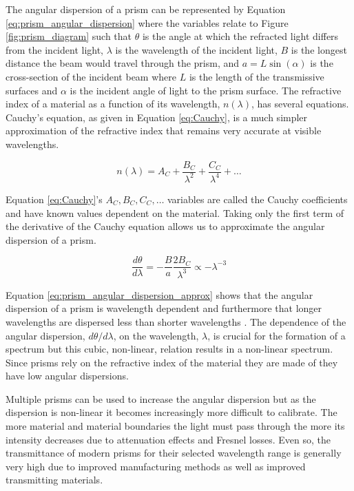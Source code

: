 The angular dispersion of a prism can be represented by Equation \ref{eq:prism_angular_dispersion} where the variables relate to Figure \ref{fig:prism_diagram} such that $\theta$ is the angle at which the refracted light differs from the incident light, $\lambda$ is the wavelength of the incident light, $B$ is the longest distance the beam would travel through the prism, and $a = L \sin(\alpha)$ is the cross-section of the incident beam where $L$ is the length of the transmissive surfaces and $\alpha$ is the incident angle of light to the prism surface. The refractive index of a material as a function of its wavelength, $n(\lambda)$, has several equations. Cauchy's equation, as given in Equation \ref{eq:Cauchy}, is a much simpler approximation of the refractive index that remains very accurate at visible wavelengths.

\begin{equation}
	n(\lambda) = A_{C} + \frac{B_{C}}{\lambda^{2}} + \frac{C_{C}}{\lambda^{4}} + \dots
    \label{eq:Cauchy}
\end{equation}

Equation \ref{eq:Cauchy}'s $A_{C}, B_{C}, C_{C}, \dots$ variables are called the Cauchy coefficients and have known values dependent on the material. Taking only the first term of the derivative of the Cauchy equation allows us to approximate the angular dispersion of a prism.

\begin{equation}
	\frac{d\theta}{d\lambda} = -\frac{B}{a}\frac{2B_{C}}{\lambda^{3}} \propto -\lambda^{-3}
    \label{eq:prism_angular_dispersion_approx}
\end{equation}

Equation \ref{eq:prism_angular_dispersion_approx} shows that the angular dispersion of a prism is wavelength dependent and furthermore that longer wavelengths are dispersed less than shorter wavelengths \citep{BirneyObsAstro, Hecht_optics}. The dependence of the angular dispersion, $d\theta/d\lambda$, on the wavelength, $\lambda$, is crucial for the formation of a spectrum but this cubic, non-linear, relation results in a non-linear spectrum. Since prisms rely on the refractive index of the material they are made of they have low angular dispersions.
\prgph

Multiple prisms can be used to increase the angular dispersion but as the dispersion is non-linear it becomes increasingly more difficult to calibrate. The more material and material boundaries the light must pass through the more its intensity decreases due to attenuation effects and Fresnel losses. Even so, the transmittance of modern prisms for their selected wavelength range is generally very high due to improved manufacturing methods as well as improved transmitting materials.
\prgph

